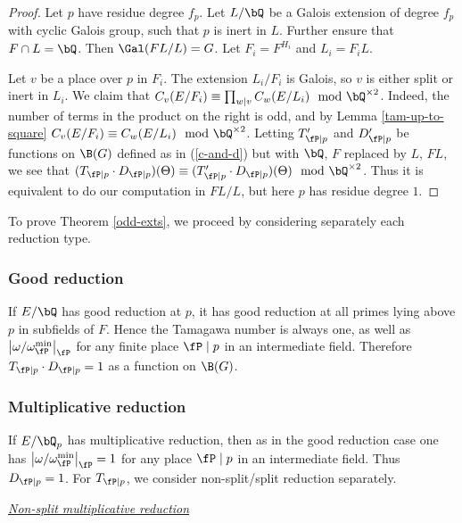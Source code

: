 \begin{proof}
Let $p$ have residue degree $f_p$. Let $L / \bQ$ be a Galois extension of degree $f_p$ with cyclic Galois group, such that $p$ is inert in $L$. Further ensure that $F \cap L = \bQ$. Then $\Gal(FL / L) = G$. Let $F_i = F^{H_i}$ and $L_i = F_i L$.

Let $v$ be a place over $p$ in $F_i$. The extension $L_i / F_i$ is Galois, so $v$ is either split or inert in $L_i$.
We claim that $C_v(E / F_i) \equiv \prod_{w | v} C_w(E / L_i) \mod \bQ^{\times 2}$. Indeed, the number of terms in the product on the right is odd, and by Lemma \ref{tam-up-to-square} $C_v(E / F_i) \equiv C_w(E / L_i) \mod \bQ^{\times 2}$. 
Letting $T_{\fP \mid p}'$ and $D_{\fP \mid p}'$ be functions on $\B(G)$ defined as in (\ref{c-and-d}) but with $\bQ$, $F$ replaced by $L$, $FL$, we see that $(T_{\fP \mid p} \cdot D_{{\fP \mid p}})(\Theta) \equiv (T_{\fP \mid p}' \cdot D_{\fP \mid p})(\Theta) \mod \bQ^{\times 2}$. 
Thus it is equivalent to do our computation in $FL / L$, but here $p$ has residue degree $1$.
\end{proof}

To prove Theorem \ref{odd-exts}, we proceed by considering separately each reduction type.

\subsubsection*{Good reduction}
If $E / \bQ$ has good reduction at $p$, it has good reduction at all primes lying above $p$ in subfields of $F$. Hence the Tamagawa number is always one, as well as $\left|\omega / \omega_{\fP}^{\min}\right|_{\fP}$ for any finite place $\fP \mid p$ in an intermediate field. Therefore $T_{\fP \mid p} \cdot D_{\fP \mid p} = 1$ as a  function on $\B(G)$.

\subsubsection*{Multiplicative reduction}

If $E / \bQ_p$ has multiplicative reduction, then as in the good reduction case one has $\left|\omega / \omega_{\fP}^{\min}\right|_{\fP} = 1$ for any place $\fP \mid p$ in an intermediate field. Thus $D_{\fP \mid p} = 1$.
For $T_{\fP \mid p}$, we consider non-split/split reduction separately.
\vspace{1em}

\noindent\underline{\textit{Non-split multiplicative reduction}}

